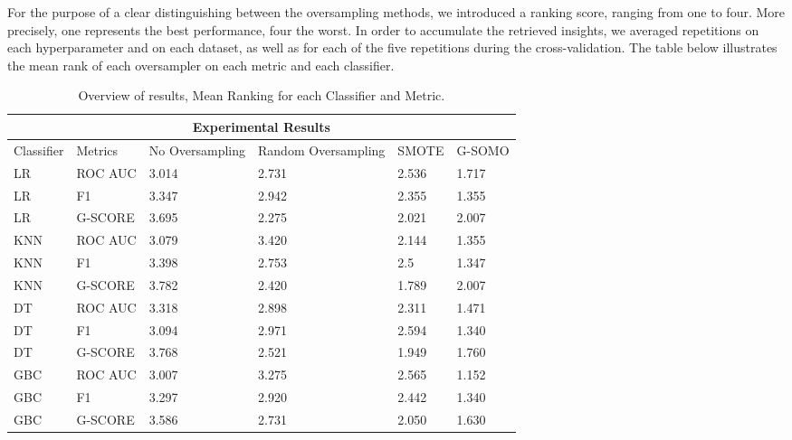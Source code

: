 \documentclass[parskip=full]{scrartcl}
\begin{document}

For the purpose of a clear distinguishing between the oversampling methods, we introduced a ranking score, ranging from one to four. More precisely, one represents the best performance, four the worst. In order to accumulate the retrieved insights, we averaged repetitions on each hyperparameter and on each dataset, as well as for each of the five repetitions during the cross-validation. The table below illustrates the mean rank of each oversampler on each metric and each classifier. 

\begin{table} [h]
   \scriptsize
   \centering

\begin{tabular}{ |p{1.4cm}||p{2cm}|p{2cm}|p{2cm}|p{2cm}|p{2cm}|  }  
 \hline
 \multicolumn{6}{|c|}{Experimental Results} \\
 \hline
 Classifier & Metrics & No Oversampling & Random Oversampling & SMOTE & G-SOMO \\
 \hline
 
LR&	ROC AUC&	3.014&	2.731&	2.536&	1.717\\
LR&	F1&	3.347&	2.942&	2.355&	1.355\\
LR&	G-SCORE&	3.695&	2.275&	2.021&	2.007\\
KNN&	ROC AUC&	3.079&	3.420&	2.144&	1.355\\
KNN&	F1&	3.398&	2.753&	2.5&	1.347\\
KNN&	G-SCORE&	3.782&	2.420&	1.789&	2.007\\
DT&	ROC AUC&	3.318&	2.898&	2.311&	1.471\\
DT&	F1&	3.094&	2.971&	2.594&	1.340\\
DT&	G-SCORE&	3.768&	2.521&	1.949&	1.760\\
GBC&	ROC AUC&	3.007&	3.275&	2.565&	1.152\\
GBC&	F1&	3.297&	2.920&	2.442&	1.340\\
GBC&	G-SCORE&	3.586&	2.731&	2.050&	1.630\\

 \hline
\end{tabular}

\caption{Overview of results, Mean Ranking for each Classifier and Metric.}
   \label{tab:test}
\end{table} 
\end{document}
